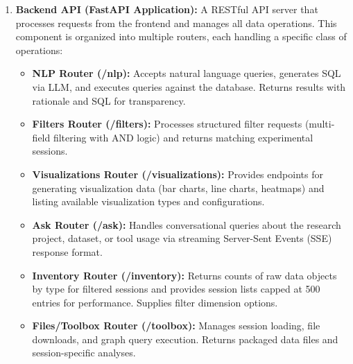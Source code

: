 \documentclass{article}
\begin{document}
\begin{enumerate}
    \item \textbf{Backend API (FastAPI Application):} A RESTful API server that processes requests from the frontend and manages all data operations. This component is organized into multiple routers, each handling a specific class of operations:
        \begin{itemize}
            \item \textbf{NLP Router (/nlp):} Accepts natural language queries, generates SQL via LLM, and executes queries against the database. Returns results with rationale and SQL for transparency.
            \item \textbf{Filters Router (/filters):} Processes structured filter requests (multi-field filtering with AND logic) and returns matching experimental sessions.
            \item \textbf{Visualizations Router (/visualizations):} Provides endpoints for generating visualization data (bar charts, line charts, heatmaps) and listing available visualization types and configurations.
            \item \textbf{Ask Router (/ask):} Handles conversational queries about the research project, dataset, or tool usage via streaming Server-Sent Events (SSE) response format.
            \item \textbf{Inventory Router (/inventory):} Returns counts of raw data objects by type for filtered sessions and provides session lists capped at 500 entries for performance. Supplies filter dimension options.
            \item \textbf{Files/Toolbox Router (/toolbox):} Manages session loading, file downloads, and graph query execution. Returns packaged data files and session-specific analyses.
        \end{itemize}
    

\end{enumerate}
\end{document}
